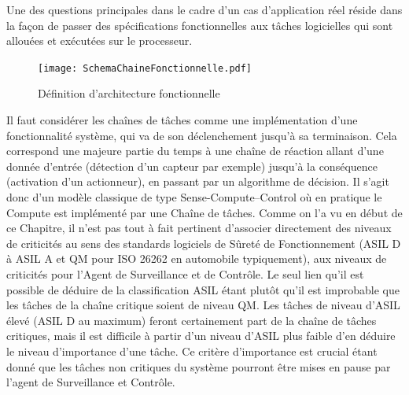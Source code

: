 \documentclass[french, a4paper, 11pt, twoside, pdftex]{StyleThese}
\begin{document}
    	
        
		Une des questions principales dans le cadre d'un cas d'application réel réside dans la façon de passer des spécifications fonctionnelles aux tâches logicielles qui sont allouées et exécutées sur le processeur.
		
		\begin{figure}[ht!]
			\centering
			\texttt{[image: SchemaChaineFonctionnelle.pdf]}
			\caption{Définition d'architecture fonctionnelle}
			\label{fig:funcArch}
		\end{figure}
	
		Il faut considérer les chaînes de tâches comme une implémentation d'une fonctionnalité système, qui va de son déclenchement jusqu'à sa terminaison. Cela correspond une majeure partie du temps à une chaîne de réaction allant d'une donnée d'entrée (détection d'un capteur par exemple) jusqu'à la conséquence (activation d'un actionneur), en passant par un algorithme de décision. Il s'agit donc d'un modèle classique de type Sense-Compute--Control où en pratique le Compute est implémenté par une Chaîne de tâches.
		Comme on l'a vu en début de ce Chapitre, il n'est pas tout à fait pertinent d'associer directement des niveaux de criticités au sens des standards logiciels de Sûreté de Fonctionnement (ASIL D à ASIL A et QM pour ISO 26262 en automobile typiquement), aux niveaux de criticités pour l'Agent de Surveillance et de Contrôle. Le seul lien qu'il est possible de déduire de la classification ASIL étant plutôt qu'il est improbable que les tâches de la chaîne critique soient de niveau QM. Les tâches de niveau d'ASIL élevé (ASIL D au maximum) feront certainement part de la chaîne de tâches critiques, mais il est difficile à partir d'un niveau d'ASIL plus faible d'en déduire le niveau d'importance d'une tâche. 
		Ce critère d'importance est crucial étant donné que les tâches non critiques du système pourront être mises en pause par l'agent de Surveillance et Contrôle.
		
\end{document}
